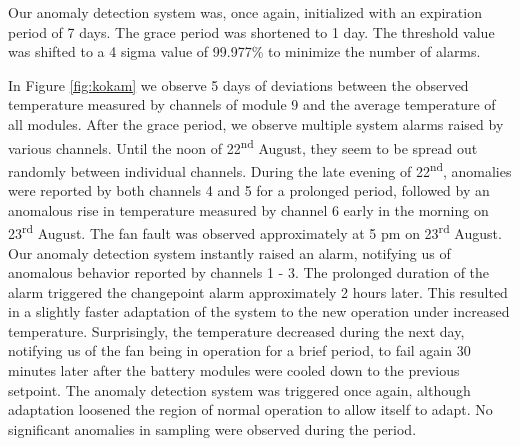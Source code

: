 Our anomaly detection system was, once again, initialized with an expiration period of 7 days. The grace period was shortened to 1 day. The threshold value was shifted to a 4 sigma value of 99.977\% to minimize the number of alarms.

In Figure \ref{fig:kokam} we observe 5 days of deviations between the observed temperature measured by channels of module 9 and the average temperature of all modules. After the grace period, we observe multiple system alarms raised by various channels. Until the noon of 22\textsuperscript{nd} August, they seem to be spread out randomly between individual channels. During the late evening of 22\textsuperscript{nd}, anomalies were reported by both channels 4 and 5 for a prolonged period, followed by an anomalous rise in temperature measured by channel 6 early in the morning on 23\textsuperscript{rd} August. The fan fault was observed approximately at 5 pm on 23\textsuperscript{rd} August. Our anomaly detection system instantly raised an alarm, notifying us of anomalous behavior reported by channels 1 - 3. The prolonged duration of the alarm triggered the changepoint alarm approximately 2 hours later. This resulted in a slightly faster adaptation of the system to the new operation under increased temperature. Surprisingly, the temperature decreased during the next day, notifying us of the fan being in operation for a brief period, to fail again 30 minutes later after the battery modules were cooled down to the previous setpoint. The anomaly detection system was triggered once again, although adaptation loosened the region of normal operation to allow itself to adapt. No significant anomalies in sampling were observed during the period.

